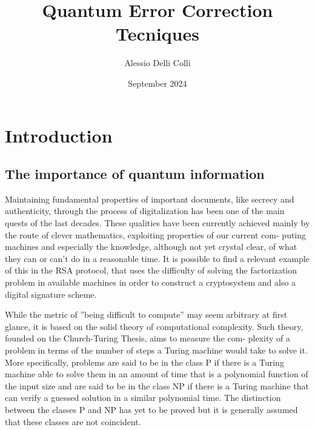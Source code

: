 \documentclass{article}
\title{Quantum Error Correction Tecniques}
\author{Alessio Delli Colli}
\date{September 2024}
\begin{document}
\nocite{nielsen2010quantum}

\maketitle

\newpage

\tableofcontents

\newpage

\section{Introduction}

\vspace{10pt}

\subsection{The importance of quantum information}

\vspace{10pt}

Maintaining fundamental properties of important documents, like secrecy
and authenticity, through the process of digitalization has been one of the main
quests of the last decades. These qualities have been currently achieved mainly
by the route of clever mathematics, exploiting properties of our current com-
puting machines and especially the knowledge, although not yet crystal clear,
of what they can or can’t do in a reasonable time.
It is possible to find a relevant example of this in the RSA protocol, that uses
the difficulty of solving the factorization problem in available machines in order
to construct a cryptosystem and also a digital signature scheme.

\vspace{10pt}

\noindent While the metric of ”being difficult to compute” may seem arbitrary at first
glance, it is based on the solid theory of computational complexity.
Such theory, founded on the Church-Turing Thesis, aims to measure the com-
plexity of a problem in terms of the number of steps a Turing machine would
take to solve it.
More specifically, problems are said to be in the class P if there is a Turing
machine able to solve them in an amount of time that is a polynomial function
of the input size and are said to be in the class NP if there is a Turing machine
that can verify a guessed solution in a similar polynomial time.
The distinction between the classes P and NP has yet to be proved but it is
generally assumed that these classes are not coincident.
\end{document}
